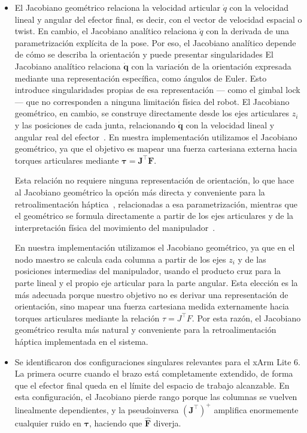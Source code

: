 \documentclass[journal,10pt,twoside]{IEEEtran}
\begin{document}
\begin{itemize}
    \item El Jacobiano geométrico relaciona la velocidad articular $\dot{q}$ con la velocidad lineal y angular del efector final, es decir, con el vector de velocidad espacial o twist. En cambio, el Jacobiano analítico relaciona $\dot{q}$ con la derivada de una parametrización explícita de la pose. Por eso, el Jacobiano analítico depende de cómo se describa la orientación y puede presentar singularidades El Jacobiano analítico relaciona $\dot{\bm{q}}$ con la variación de la orientación expresada mediante una representación específica, como ángulos de Euler. Esto introduce singularidades propias de esa representación — como el gimbal lock — que no corresponden a ninguna limitación física del robot. El Jacobiano geométrico, en cambio, se construye directamente desde los ejes articulares $\hat{z}_i$ y las posiciones de cada junta, relacionando $\dot{\bm{q}}$ con la velocidad lineal y angular real del efector~\cite{siciliano2009}.
    En nuestra implementación utilizamos el Jacobiano geométrico, ya que el objetivo es mapear una fuerza cartesiana externa hacia torques articulares mediante $\bm{\tau} = \bm{J}^\top \bm{F}$. 

    Esta relación no requiere ninguna representación de orientación, lo que hace al Jacobiano geométrico la opción más directa y conveniente para la retroalimentación háptica~\cite{spong2006}, relacionadas a esa parametrización, mientras que el geométrico se formula directamente a partir de los ejes articulares y de la interpretación física del movimiento del manipulador~\cite{ramos2021}.

    En nuestra implementación utilizamos el Jacobiano geométrico, ya que en el nodo maestro se calcula cada columna a partir de los ejes $z_i$ y de las posiciones intermedias del manipulador, usando el producto cruz para la parte lineal y el propio eje articular para la parte angular. Esta elección es la más adecuada porque nuestro objetivo no es derivar una representación de orientación, sino mapear una fuerza cartesiana medida externamente hacia torques articulares mediante la relación $\tau = J^{\top}F$. Por esta razón, el Jacobiano geométrico resulta más natural y conveniente para la retroalimentación háptica implementada en el sistema.
    \\
    
    \item Se identificaron dos configuraciones singulares relevantes para el xArm Lite 6. La primera ocurre cuando el brazo está completamente extendido, de forma que el efector final queda en el límite del espacio de trabajo alcanzable. En esta configuración, el Jacobiano pierde rango porque las columnas se vuelven linealmente dependientes, y la pseudoinversa $(\bm{J}^\top)^+$ amplifica enormemente cualquier ruido en $\bm{\tau}$, haciendo que $\hat{\bm{F}}$ diverja.
    

\end{itemize}
\end{document}
